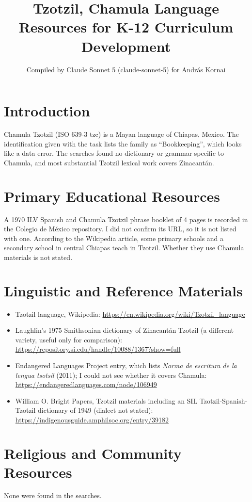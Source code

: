 \documentclass[12pt]{article}
\title{Tzotzil, Chamula Language Resources for K-12 Curriculum Development}
\author{Compiled by Claude Sonnet 5 (claude-sonnet-5) for Andr\'as Kornai}
\date{}
\begin{document}
\maketitle

\section{Introduction}
Chamula Tzotzil (ISO 639-3 tzc) is a Mayan language of Chiapas, Mexico. The identification given with the task lists the family as ``Bookkeeping'', which looks like a data error. The searches found no dictionary or grammar specific to Chamula, and most substantial Tzotzil lexical work covers Zinacant\'an.

\section{Primary Educational Resources}
A 1970 ILV Spanish and Chamula Tzotzil phrase booklet of 4 pages is recorded in the Colegio de M\'exico repository. I did not confirm its URL, so it is not listed with one. According to the Wikipedia article, some primary schools and a secondary school in central Chiapas teach in Tzotzil. Whether they use Chamula materials is not stated.

\section{Linguistic and Reference Materials}
\begin{itemize}
\item Tzotzil language, Wikipedia: \url{https://en.wikipedia.org/wiki/Tzotzil_language}
\item Laughlin's 1975 Smithsonian dictionary of Zinacant\'an Tzotzil (a different variety, useful only for comparison): \url{https://repository.si.edu/handle/10088/1367?show=full}
\item Endangered Languages Project entry, which lists \emph{Norma de escritura de la lengua tsotsil} (2011); I could not see whether it covers Chamula: \url{https://endangeredlanguages.com/node/106949}
\item William O. Bright Papers, Tzotzil materials including an SIL Tzotzil-Spanish-Tzotzil dictionary of 1949 (dialect not stated): \url{https://indigenousguide.amphilsoc.org/entry/39182}
\end{itemize}

\section{Religious and Community Resources}
None were found in the searches.
\end{document}
